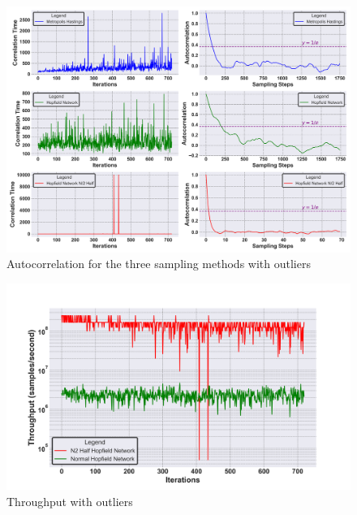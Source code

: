 \label{attachement:autocorrelation_errors}
\begin{figure}[H]
  \centering
  \includegraphics[width=0.9\linewidth]{graphics/Visualisierungen_Autocorr_individual_8.png}
  \caption{Autocorrelation for the three sampling methods with outliers}
\end{figure}

\label{attachement:throughput_errors}
\begin{figure}[H]
  \centering
  \includegraphics[width=0.8\linewidth]{graphics/Visualisierungen_throughput_log_3.png}
  \caption{Throughput with outliers}
\end{figure}


